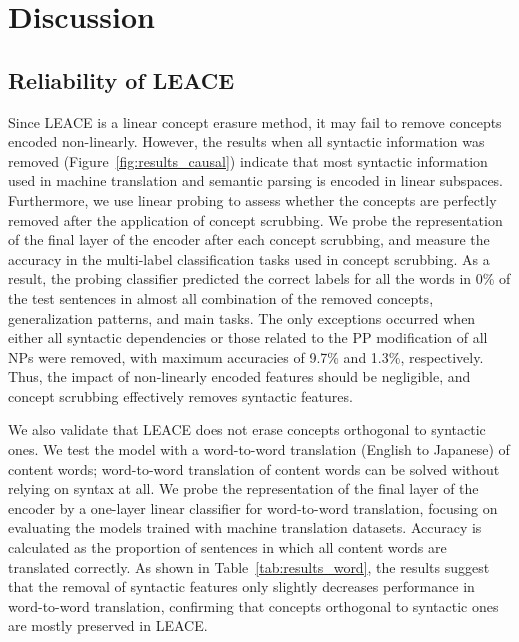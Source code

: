 \section{Discussion}
\label{sec:discussion}
\subsection{Reliability of LEACE}

Since LEACE is a linear concept erasure method, it may fail to remove concepts encoded non-linearly.
However, the results when all syntactic information was removed (Figure~\ref{fig:results_causal}) indicate that most syntactic information used in machine translation and semantic parsing is encoded in linear subspaces.
Furthermore, we use linear probing to assess whether the concepts are perfectly removed after the application of concept scrubbing.
We probe the representation of the final layer of the encoder after each concept scrubbing, and measure the accuracy in the multi-label classification tasks used in concept scrubbing.
As a result, the probing classifier predicted the correct labels for all the words in 0\% of the test sentences in almost all combination of the removed concepts, generalization patterns, and main tasks.
The only exceptions occurred when either all syntactic dependencies or those related to the PP modification of all NPs were removed, with maximum accuracies of 9.7\% and 1.3\%, respectively.
Thus, the impact of non-linearly encoded features should be negligible, and concept scrubbing effectively removes syntactic features.


We also validate that LEACE does not erase concepts orthogonal to syntactic ones.
We test the model with a word-to-word translation (English to Japanese) of content words; word-to-word translation of content words can be solved without relying on syntax at all.
We probe the representation of the final layer of the encoder by a one-layer linear classifier for word-to-word translation, focusing on evaluating the models trained with machine translation datasets. Accuracy is calculated as the proportion of sentences in which all content words are translated correctly.
As shown in Table~\ref{tab:results_word}, the results suggest that the removal of syntactic features only slightly decreases performance in word-to-word translation, confirming that concepts orthogonal to syntactic ones are mostly preserved in LEACE.

